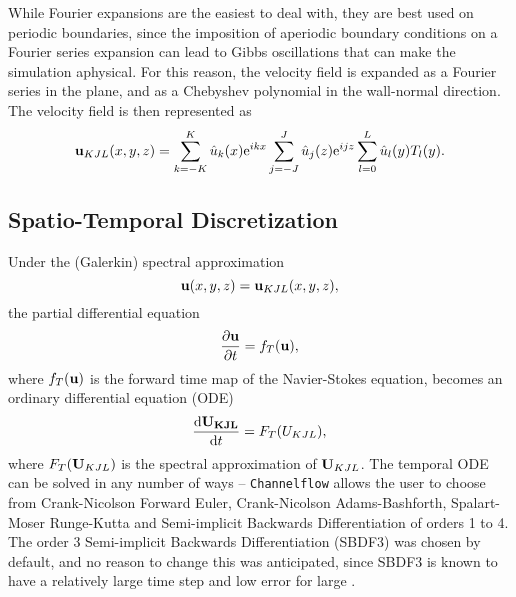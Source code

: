 While Fourier expansions are the easiest to deal with, they are best used on periodic boundaries, since the imposition of aperiodic boundary conditions on a Fourier series expansion can lead to Gibbs oscillations that can make the simulation aphysical. For this reason, the velocity field is expanded as a Fourier series in the plane, and as a Chebyshev polynomial in the wall-normal direction. The velocity field is then represented as 
\begin{equation}
\Vector{u}_{KJL}(x,y,z) = \sum{k=-K}{K}{\hat{u}_k(x)\exp{ikx}}\sum{j=-J}{J}{\hat{u}_j(z)\exp{ijz}}\sum{l=0}{L}{\hat{u}_l(y)T_l(y)}.
\end{equation}

\subsection{Spatio-Temporal Discretization} 

Under the (Galerkin) spectral approximation 
\begin{equation}
\mathbf{u}(x,y,z) = \mathbf{u}_{KJL}(x,y,z),
\end{equation}
the partial differential equation
\begin{equation}
\pder{1}{\Vector{u}}{t} = f_T(\Vector{u}),
\end{equation}
where $f_T(\mathbf{u})$ is the forward time map of the Navier-Stokes equation, becomes an ordinary differential equation (ODE)
\begin{equation}
\der{1}{\Vector{U_{KJL}}}{t} = F_T(U_{KJL}), 
\end{equation}
where $F_T(\mathbf{U}_{KJL})$ is the spectral approximation of $\mathbf{U}_{KJL}$. The temporal ODE can be solved in any number of ways -- {\tt Channelflow} allows the user to choose from Crank-Nicolson Forward Euler, Crank-Nicolson Adams-Bashforth, Spalart-Moser Runge-Kutta and Semi-implicit Backwards Differentiation of orders 1 to 4. The order 3 Semi-implicit Backwards Differentiation (SBDF3) was chosen by default, and no reason to change this was anticipated, since SBDF3 is known to have a relatively large time step and low error for large \ReN{}.

